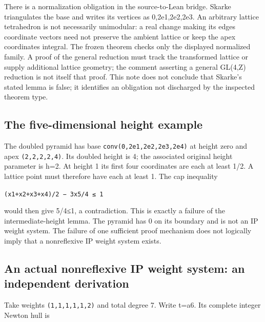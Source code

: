 \documentclass[11pt,a4paper,oneside]{report}
\begin{document}
There is a normalization obligation in the source-to-Lean bridge. Skarke
triangulates the base and writes its vertices as 0,2e1,2e2,2e3. An
arbitrary lattice tetrahedron is not necessarily unimodular: a real
change making its edges coordinate vectors need not preserve the ambient
lattice or keep the apex coordinates integral. The frozen theorem checks
only the displayed normalized family. A proof of the general reduction
must track the transformed lattice or supply additional lattice
geometry; the comment asserting a general GL(4,Z) reduction is not
itself that proof. This note does not conclude that Skarke's stated
lemma is false; it identifies an obligation not discharged by the
inspected theorem type.

\subsection{The five-dimensional height
example}\label{ip-reflexivity-and-pyramids--the-five-dimensional-height-example}

The doubled pyramid has base
\texttt{conv(\allowbreak{}0,\allowbreak{}2e1,\allowbreak{}2e2,\allowbreak{}2e3,\allowbreak{}2e4)}
at height zero and apex
\texttt{(\allowbreak{}2,\allowbreak{}2,\allowbreak{}2,\allowbreak{}2,\allowbreak{}4)}.
Its doubled height is 4; the associated original height parameter is
h=2. At height 1 its first four coordinates are each at least 1/2. A
lattice point must therefore have each at least 1. The cap inequality

\texttt{(\allowbreak{}x1+x2+x3+x4)\allowbreak{}/\allowbreak{}2 − 3x5/\allowbreak{}4 ≤ 1}

would then give 5/4≤1, a contradiction. This is exactly a failure of the
intermediate-height lemma. The pyramid has 0 on its boundary and is not
an IP weight system. The failure of one sufficient proof mechanism does
not logically imply that a nonreflexive IP weight system exists.

\subsection{An actual nonreflexive IP weight system: an independent
derivation}\label{ip-reflexivity-and-pyramids--an-actual-nonreflexive-ip-weight-system-an-independent-derivation}

Take weights
\texttt{(\allowbreak{}1,\allowbreak{}1,\allowbreak{}1,\allowbreak{}1,\allowbreak{}1,\allowbreak{}2)}
and total degree 7. Write t=a6. Its complete integer Newton hull is
\end{document}
